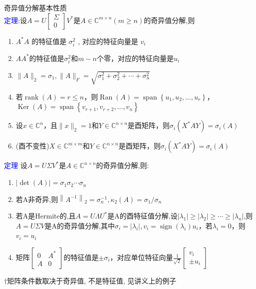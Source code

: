 \documentclass[12pt,a4paper]{article}
\begin{document}
\noindent 奇异值分解基本性质\\
\textcolor{blue}{定理:}设$A=U\left[\begin{array}{l}{\Sigma} \\ {0}\end{array}\right] V^{*}$是$A \in \mathbb{C}^{m \times n}(m \geq n)$的奇异值分解,则
\begin{enumerate}[(1)]
	\item $A^{*} A$ 的特征值是 $\sigma_{i}^{2}$ , 对应的特征向量是 $v_{i}$
	\item $AA^{*}$的特征值是$\sigma_{i}^{2}$和$m-n$个零，对应的特征向量是$u_{i}$
	\item $\|A\|_{2}=\sigma_{1},\|A\|_{F}=\sqrt{\sigma_{1}^{2}+\sigma_{2}^{2}+\cdots+\sigma_{n}^{2}}$
	\item 若$\operatorname{rank}(A)=r \leq n$，则$\operatorname{Ran}(A)=\operatorname{span}\left\{u_{1}, u_{2}, \ldots, u_{r}\right\}$，$\operatorname{Ker}(A)=\operatorname{span}\left\{v_{r+1}, v_{r+2}, \ldots, v_{n}\right\}$
	\item 设$x \in \mathbb{C}^{n}$，且$\|x\|_{2}=1$和$Y \in \mathbb{C}^{n \times n}$是酉矩阵，则$\sigma_{i}\left(X^{*} A Y\right)=\sigma_{i}(A)$
	\item (酉不变性)$X \in \mathbb{C}^{m \times m}$和$Y \in \mathbb{C}^{n \times n}$是酉矩阵，则$\sigma_{i}\left(X^{*} A Y\right)=\sigma_{i}(A)$
\end{enumerate}
\textcolor{blue}{定理} 设$A=U \Sigma V^{*}$是$A \in \mathbb{C}^{n \times n}$的奇异值分解,则:
\begin{enumerate}[(1)]
	\item $|\operatorname{det}(A)|=\sigma_{1} \sigma_{2} \cdots \sigma_{n}$
	\item 若A非奇异,则$\left\|A^{-1}\right\|_{2}=\sigma_{n}^{-1}, \kappa_{2}(A)=\sigma_{1} / \sigma_{n}$
	\item 若A是Hermite的,且$A=U \Lambda U^{*}$是A的酉特征值分解,设$\left|\lambda_{1}\right| \geq\left|\lambda_{2}\right| \geq \cdots \geq\left|\lambda_{n}\right|$,则$A=U \Sigma V$是A的奇异值分解,其中$\sigma_{i}=\left|\lambda_{i}\right|, v_{i}=\operatorname{sign}\left(\lambda_{i}\right) u_{i}$，若$\lambda_{i}=0$，则$v_{i}=u_{i}$
	\item 矩阵$\left[\begin{array}{cc}{0} & {A^{*}} \\ {A} & {0}\end{array}\right]$的特征值是$\pm \sigma_{i}$，对应单位特征向量$\frac{1}{\sqrt{2}}\left[\begin{array}{c}{v_{i}} \\ { \pm u_{i}}\end{array}\right]$
\end{enumerate}
$\dagger$矩阵条件数取决于奇异值, 不是特征值, 见讲义上的例子\\
\end{document}
